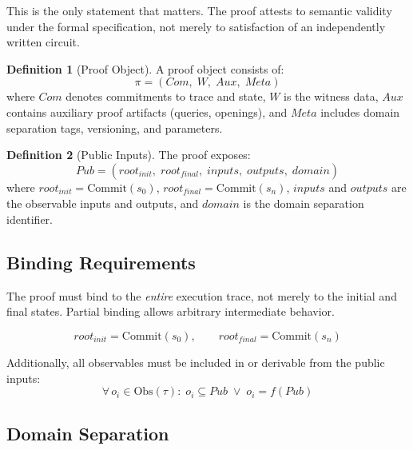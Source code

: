 \documentclass[11pt,a4paper]{article}
\theoremstyle{definition}
\newtheorem{definition}{Definition}[section]
\newcommand{\Obs}{\mathrm{Obs}}
\newcommand{\Commit}{\mathrm{Commit}}
\begin{document}
This is the only statement that matters. The proof attests to semantic validity under the formal specification, not merely to satisfaction of an independently written circuit.

\begin{definition}[Proof Object]
\label{def:proof-object}
A proof object consists of:
\begin{equation}
\pi = (\mathit{Com},\; W,\; \mathit{Aux},\; \mathit{Meta})
\end{equation}
where $\mathit{Com}$ denotes commitments to trace and state, $W$ is the witness data, $\mathit{Aux}$ contains auxiliary proof artifacts (queries, openings), and $\mathit{Meta}$ includes domain separation tags, versioning, and parameters.
\end{definition}

\begin{definition}[Public Inputs]
\label{def:public-inputs}
The proof exposes:
\begin{equation}
\mathit{Pub} = (\mathit{root}_{\mathit{init}},\; \mathit{root}_{\mathit{final}},\; \mathit{inputs},\; \mathit{outputs},\; \mathit{domain})
\end{equation}
where $\mathit{root}_{\mathit{init}} = \Commit(s_0)$, $\mathit{root}_{\mathit{final}} = \Commit(s_n)$, $\mathit{inputs}$ and $\mathit{outputs}$ are the observable inputs and outputs, and $\mathit{domain}$ is the domain separation identifier.
\end{definition}

\subsection{Binding Requirements}
\label{subsec:binding}

The proof must bind to the \emph{entire} execution trace, not merely to the initial and final states. Partial binding allows arbitrary intermediate behavior.

\begin{equation}
\mathit{root}_{\mathit{init}} = \Commit(s_0), \qquad \mathit{root}_{\mathit{final}} = \Commit(s_n)
\end{equation}

Additionally, all observables must be included in or derivable from the public inputs:
\begin{equation}
\forall\, o_i \in \Obs(\tau):\; o_i \subseteq \mathit{Pub} \;\lor\; o_i = f(\mathit{Pub})
\end{equation}

\subsection{Domain Separation}
\label{subsec:domain-separation}
\end{document}
